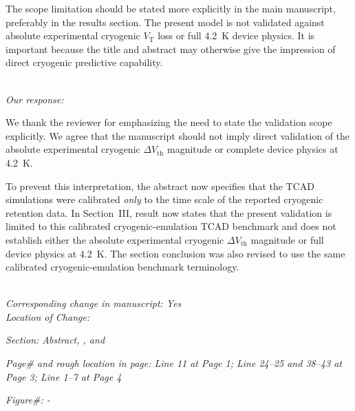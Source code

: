 \documentclass[11pt]{article}
\begin{document}
The scope limitation should be stated more explicitly in the main manuscript, preferably in the results section.
The present model is not validated against absolute experimental cryogenic $V_\mathrm{T}$ loss or full 4.2~K device physics.
It is important because the title and abstract may otherwise give the impression of direct cryogenic predictive capability.

\noindent \textit{\\Our response:}

We thank the reviewer for emphasizing the need to state the validation scope explicitly.
We agree that the manuscript should not imply direct validation of the absolute experimental cryogenic $\Delta V_\mathrm{th}$ magnitude or complete device physics at 4.2~K.

To prevent this interpretation, the abstract now specifies that the TCAD simulations were calibrated \textit{only} to the time scale of the reported cryogenic retention data.
In Section~III, result now states that the present validation is limited to this calibrated cryogenic-emulation TCAD benchmark and does not establish either the absolute experimental cryogenic $\Delta V_\mathrm{th}$ magnitude or full device physics at 4.2~K.
The section \uppercase\expandafter{} conclusion was also revised to use the same calibrated cryogenic-emulation benchmark terminology.


\noindent \textit{\\Corresponding change in manuscript: Yes \\Location of Change:}

\hspace{40pt} \noindent \textit{Section: Abstract, \uppercase\expandafter{}, and \uppercase\expandafter{}}

\hspace{40pt} \noindent \textit{Page\# and rough location in page: Line 11 at Page 1; Line 24--25 and 38--43 at Page 3; Line 1--7 at Page 4}

\hspace{40pt} \noindent \textit{Figure\#: -}
\end{document}
